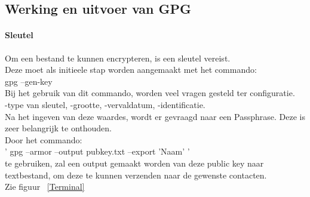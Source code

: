 \documentclass[12pt]{article}
\begin{document}
				\cite{Tabellen}
			
			\newpage		
			\subsection{Werking en uitvoer van GPG}\label{Werk}	
				\paragraph*{Sleutel} 
				Om een bestand te kunnen encrypteren, is een sleutel vereist.\\
				Deze moet als initieele stap worden aangemaakt met het commando:\\
				gpg --gen-key\\
				Bij het gebruik van dit commando, worden veel vragen gesteld ter configuratie.\\
				-type van sleutel, -grootte, -vervaldatum, -identificatie.\\
				Na het ingeven van deze waardes, wordt er gevraagd naar een Passphrase.
				Deze is zeer belangrijk te onthouden.\\
				Door het commando:\\
				' gpg --armor --output pubkey.txt --export 'Naam' '\\
				te gebruiken, zal een output gemaakt worden van deze public key naar textbestand,
				om deze te kunnen verzenden naar de gewenste contacten.\\
				Zie figuur ~\ref{Terminal}\\
				
\end{document}
